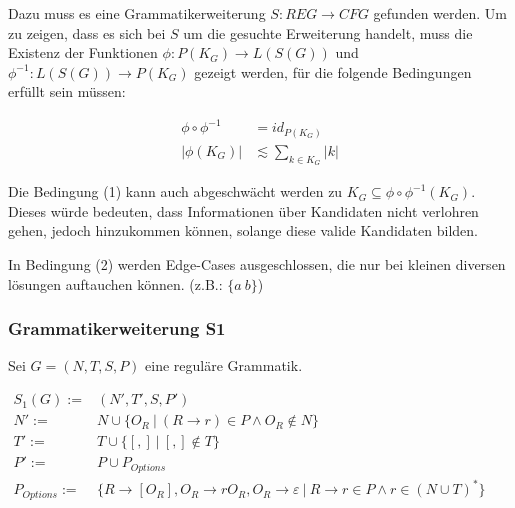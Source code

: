 \documentclass[]{article}
\begin{document}
Dazu muss es eine Grammatikerweiterung $S: REG\rightarrow CFG$ gefunden werden.
Um zu zeigen, dass es sich bei $S$ um die gesuchte Erweiterung handelt, muss die Existenz der Funktionen $\phi: P(K_G) \rightarrow L(S(G))$ und $\phi^{-1}: L(S(G)) \rightarrow P(K_G)$ gezeigt werden, für die folgende Bedingungen erfüllt sein müssen:

\begin{align}
  \phi\circ\phi^{-1} &= id_{P(K_G)} \\
  |\phi(K_G)| &\lesssim \sum_{k\in K_G} |k|
\end{align}


Die Bedingung (1) kann auch abgeschwächt werden zu $K_G\subseteq \phi\circ\phi^{-1}(K_G)$. Dieses würde bedeuten, dass Informationen über Kandidaten nicht verlohren gehen, jedoch hinzukommen können, solange diese valide Kandidaten bilden.

In Bedingung (2) werden Edge-Cases ausgeschlossen, die nur bei kleinen diversen lösungen auftauchen können. (z.B.: $\{a\ b\}$)


% 
%     

\subsubsection*{Grammatikerweiterung S1}

Sei $G = (N,T,S,P)$ eine reguläre Grammatik.


$
\begin{array}{rl}
  S_1(G) :=& (N', T', S, P') \\
  N' :=& N \cup \{ O_R\ |\ (R\rightarrow r)\in P\land O_R \notin N\}\\
  T' :=& T \cup \{[ , ]\ |\ [,]\notin T \}\\
  P' :=& P
  \cup P_{Options} 
  \\
  P_{Options} :=& \{R \rightarrow [O_R], O_R \rightarrow r O_R, O_R \rightarrow \varepsilon \ \vert\ R\rightarrow r\in P
  \land r\in (N\cup T)^*\} \\
\end{array}
$
\end{document}
